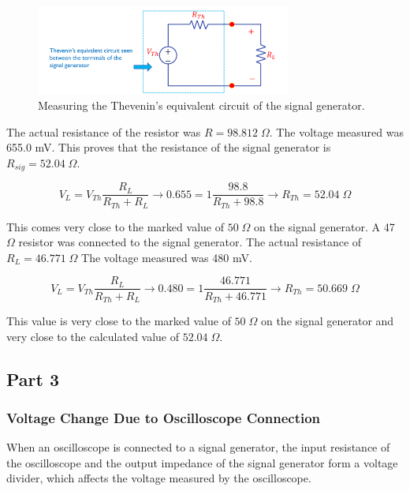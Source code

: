 \documentclass{article}
\begin{document}
\begin{figure}[H]
	\centering
	\includegraphics[width=0.75\textwidth]{signal generator.png}
	\caption{Measuring the Thevenin's equivalent circuit of the signal generator.}
	\label{fig:fig3}
\end{figure}
The actual resistance of the resistor was $R = 98.812 \; \Omega$. The 
voltage measured was 655.0 mV. This proves that the resistance of the 
signal generator is $R_{sig} = 52.04 \; \Omega$.
\begin{center}
\[
	V_L = V_{Th} \frac{R_L}{R_{Th} + R_L} \rightarrow 0.655 = 1 \frac{98.8}{R_{Th} + 98.8} \rightarrow R_{Th} = 52.04 \; \Omega
\]	
\end{center}
This comes very close to the marked value of $50 \; \Omega$ on 
the signal generator. A 47 $\Omega$ resistor was connected to the signal
generator. The actual resistance of $R_L = 46.771 \; \Omega$ The voltage
measured was 480 mV. 
\begin{center}
\[
	V_L = V_{Th} \frac{R_L}{R_{Th} + R_L} \rightarrow 0.480 = 1 \frac{46.771}{R_{Th} + 46.771} \rightarrow R_{Th} = 50.669 \; \Omega
\]	
\end{center}

This value is very close to the marked value of $50 \; \Omega$ on the 
signal generator and very close to the calculated value of $52.04 \; \Omega$.

\subsection*{Part 3}

\subsubsection*{Voltage Change Due to Oscilloscope Connection}

When an oscilloscope is connected to a signal generator, the input resistance of the oscilloscope and the output impedance of the signal generator form a voltage divider, which affects the voltage measured by the oscilloscope.
\end{document}
